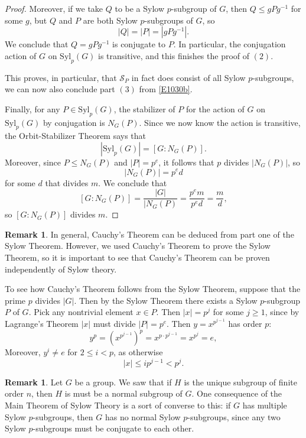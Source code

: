 \documentclass[12pt]{report}
\numberwithin{equation}{section}
\numberwithin{theorem}{chapter}
\theoremstyle{definition}
\newtheorem*{basic properties}{Basic Properties}
\newtheorem*{Important Remark}{Important Remark}
\newtheorem{remark}[theorem]{Remark}
\newcommand{\cS}{\mathcal{S}}
\begin{document}
\begin{proof}
Moreover, if we take $Q$ to be a Sylow $p$-subgroup of $G$, then $Q \leq gPg^{-1}$ for some $g$, but $Q$ and $P$ are both Sylow $p$-subgroups of $G$, so
$$|Q| = |P| = |gPg^{-1}|.$$
We conclude that $Q = gPg^{-1}$ is conjugate to $P$. In particular, the conjugation action of $G$ on $\mathrm{Syl}_p(G)$ is transitive, and this finishes the proof of $(2)$.


This proves, in particular, that $\cS_P$ in fact does consist of all Sylow $p$-subgroups, we can now also conclude part $(3)$ from \eqref{E1030b}.

Finally, for any $P \in \mathrm{Syl}_p(G)$, the stabilizer of $P$ for the action of $G$ on $\mathrm{Syl}_p(G)$ by conjugation is $N_G(P)$. Since we now know the action is transitive, the Orbit-Stabilizer Theorem says that
$$|\mathrm{Syl}_p(G)| = [G: N_G(P)].$$
Moreover, since $P \leq N_G(P)$ and $|P| = p^e$, it follows that $p$ divides $|N_G(P)|$, so
$$|N_G(P)| = p^e d$$
for some $d$ that divides $m$. We conclude that
$$[G: N_G(P)] = \frac{|G|}{|N_G(P)} = \frac{p^em}{p^ed} = \frac{m}{d},$$
so $[G: N_G(P)]$ divides $m$.
\end{proof}



\begin{remark} 
In general, Cauchy's Theorem can be deduced from part one of the Sylow Theorem. However, we used Cauchy's Theorem to prove the Sylow Theorem, so it is important to see that Cauchy's Theorem can be proven independently of Sylow theory.

To see how Cauchy's Theorem follows from the Sylow Theorem, suppose that the prime $p$ divides $|G|$. Then by the Sylow Theorem there exists a Sylow $p$-subgroup $P$ of $G$. Pick any nontrivial element $x \in P$. Then $|x| = p^j$ for some $j \geqslant 1$, since  by Lagrange's Theorem $|x|$ must divide $|P| = p^e$. Then $y = x^{p^{j-1}}$ has order $p$:
$$y^p = \left( x^{p^{j-1}} \right)^p  =x^{p \cdot p^{j-1}} = x^{p^{j}} = e,$$
 Moreover, $y^i \neq e$ for $2 \leqslant i < p$, as otherwise 
 $$|x| \leqslant ip^{j-1} < p^j.$$

\end{remark}


\begin{remark}
Let $G$ be a group. We saw that if $H$ is the unique subgroup of finite order $n$, then $H$ is must be a normal subgroup of $G$. 
One consequence of the Main Theorem of Sylow Theory is a sort of converse to this: if $G$ has multiple Sylow $p$-subgroups, then $G$ has no normal Sylow $p$-subgroups, since any two Sylow $p$-subgroups must be conjugate to each other.
\end{remark}
\end{document}

